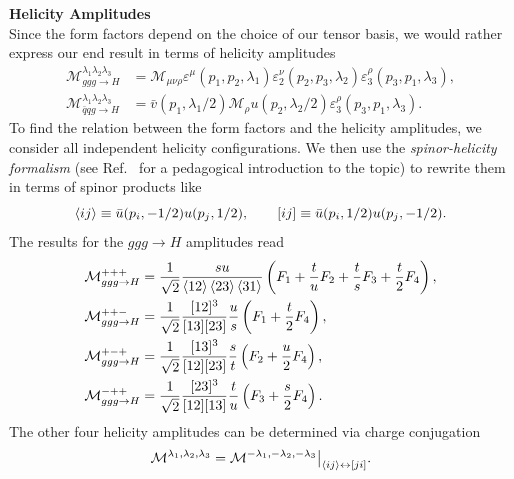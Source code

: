 \textbf{Helicity Amplitudes} \\
Since the form factors depend on the choice of our tensor basis, we would rather express our end result in terms of helicity amplitudes
\begin{equation}
\begin{split}
\mathcal{M}^{\lambda_1 \lambda_2 \lambda_3}_{ggg \rightarrow H} &= \mathcal{M}_{\mu \nu \rho} \varepsilon^\mu(p_1, p_2, \lambda_1) \varepsilon_2^\nu(p_2, p_3, \lambda_2) \varepsilon_3^\rho(p_3, p_1, \lambda_3), \\
\mathcal{M}^{\lambda_1 \lambda_2 \lambda_3}_{\bar{q}q g \rightarrow H} &= \bar{v}(p_1, \lambda_1/2) \mathcal{M}_{\rho} u(p_2, \lambda_2/2)  \varepsilon_3^\rho(p_3, p_1, \lambda_3).
\end{split}
\end{equation}
To find the relation between the form factors and the helicity amplitudes, we consider all independent helicity configurations. We then use the \textit{spinor-helicity formalism} (see Ref.~\cite{Dixon:1996wi} for a pedagogical introduction to the topic) to rewrite them in terms of spinor products like
\begin{equation}
\braket{ij} \equiv \bar{u}(p_i, -1/2) u(p_j, 1/2), \qquad [ij] \equiv \bar{u}(p_i, 1/2) u(p_j, -1/2).
\end{equation}
The results for the $ggg \rightarrow H$ amplitudes read
\begin{equation}
\begin{split}
\mathcal{M}_{ggg\rightarrow H}^{+++} &= \frac{1}{\sqrt{2}} \frac{s u}{\braket{12} \braket{23} \braket{31}} \left( F_1 + \frac{t}{u} F_2 + \frac{t}{s} F_3 + \frac{t}{2} F_4 \right), \\
\mathcal{M}_{ggg\rightarrow H}^{++-} &= \frac{1}{\sqrt{2}} \frac{[12]^3}{[13][23]} \frac{u}{s} \left(F_1 + \frac{t}{2} F_4 \right), \\
\mathcal{M}_{ggg\rightarrow H}^{+-+} &= \frac{1}{\sqrt{2}} \frac{[13]^3}{[12][23]} \frac{s}{t} \left(F_2 + \frac{u}{2} F_4 \right), \\
\mathcal{M}_{ggg\rightarrow H}^{-++} &= \frac{1}{\sqrt{2}} \frac{[23]^3}{[12][13]} \frac{t}{u} \left(F_3 + \frac{s}{2} F_4 \right).
\end{split}
\end{equation}
The other four helicity amplitudes can be determined via charge conjugation
\begin{equation}
\mathcal{M}^{\lambda_1, \lambda_2, \lambda_3} = \mathcal{M}^{-\lambda_1, - \lambda_2, -\lambda_3} \big \vert_{\braket{ij} \leftrightarrow [ji]}.
\label{eq:5:parity}
\end{equation}
